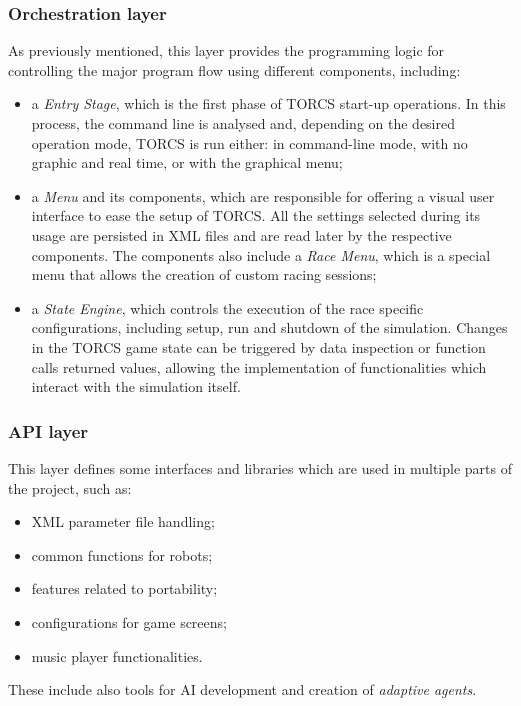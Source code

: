 \subsubsection{Orchestration layer}
As previously mentioned, this layer provides the programming logic for controlling the major program flow using different components, including:
\begin{itemize}
	\item a \textit{Entry Stage}, which is the first phase of TORCS start-up operations. In this process, the command line is analysed and, depending on the desired operation mode, TORCS is run either: in command-line mode, with no graphic and real time, or with the graphical menu;
	\item a \textit{Menu} and its components, which are responsible for offering a visual user interface to ease the setup of TORCS. All the settings selected during its usage are persisted in XML files and are read later by the respective components. The components also include a \textit{Race Menu}, which is a special menu that allows the creation of custom racing sessions;
	\item a \textit{State Engine}, which controls the execution of the race specific configurations, including setup, run and shutdown of the simulation. Changes in the TORCS game state can be triggered by data inspection or function calls returned values, allowing the implementation of functionalities which interact with the simulation itself.
\end{itemize}

\subsubsection{API layer}
This layer defines some interfaces and libraries which are used in multiple parts of the project, such as:
\begin{itemize}
	\item XML parameter file handling;
	\item common functions for robots;
	\item features related to portability;
	\item configurations for game screens;
	\item music player functionalities.
\end{itemize}
These include also tools for AI development and creation of \textit{adaptive agents}.

